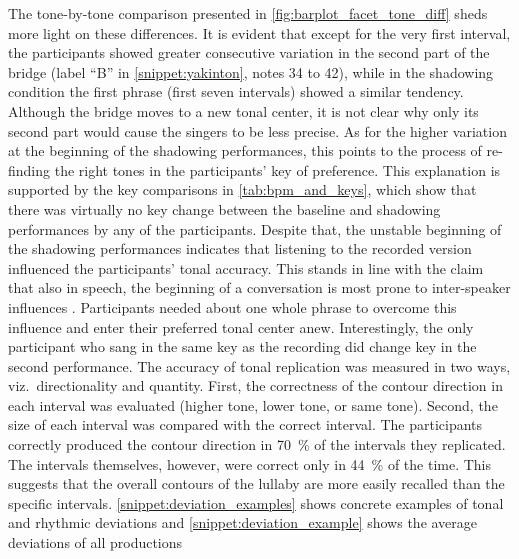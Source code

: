 %
The tone-by-tone comparison presented in \cref{fig:barplot_facet_tone_diff} sheds more light on these differences.
It is evident that except for the very first interval, the participants showed greater consecutive variation in the second part of the bridge (label \enquote{B} in \cref{snippet:yakinton}, notes 34 to 42), while in the shadowing condition the first phrase (first seven intervals) showed a similar tendency.
Although the bridge moves to a new tonal center, it is not clear why only its second part would cause the singers to be less precise.
As for the higher variation at the beginning of the shadowing performances, this points to the process of re-finding the right tones in the participants' key of preference.
This explanation is supported by the key comparisons in \cref{tab:bpm_and_keys}, which show that there was virtually no key change between the baseline and shadowing performances by any of the participants.
Despite that, the unstable beginning of the shadowing performances indicates that listening to the recorded version influenced the participants' tonal accuracy.
This stands in line with the claim that also in speech, the beginning of a conversation is most prone to inter-speaker influences \citep[e.g.][]{Orlob2018nine}.
Participants needed about one whole phrase to overcome this influence and enter their preferred tonal center anew.
Interestingly, the only participant who sang in the same key as the recording did change key in the second performance.
The accuracy of tonal replication was measured in two ways, viz.\ directionality and quantity.
First, the correctness of the contour direction in each interval was evaluated (higher tone, lower tone, or same tone).
Second, the size of each interval was compared with the correct interval.
The participants correctly produced the contour direction in \SI{70}{\percent} of the intervals they replicated.
The intervals themselves, however, were correct only in \SI{44}{\percent} of the time.
This suggests that the overall contours of the lullaby are more easily recalled than the specific intervals.
\cref{snippet:deviation_examples} shows concrete examples of tonal and rhythmic deviations and \cref{snippet:deviation_example} shows the average deviations of all productions
%
